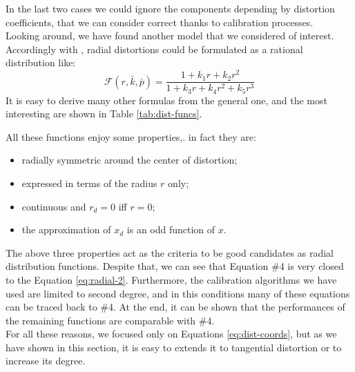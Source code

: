 In the last two cases we could ignore the components depending by distortion coefficients, that we can consider correct thanks to calibration processes. \\

Looking around, we have found another model that we considered of interest. Accordingly with \cite{DBLP:journals/corr/cs-CV-0308003}, radial distortions could be formulated as a rational distribution like:
  \begin{equation*}
    \mathcal{F}\left( r, \bar{k}, \bar{p} \right) = \frac{1 + k_1r + k_2r^2}{1 + k_3r + k_4r^2 + k_5r^3}
  \end{equation*}
It is easy to derive many other formulas from the general one, and the most interesting are shown in Table \ref{tab:dist-funcs}.
  
All these functions enjoy some properties,. in fact they are:
  \begin{itemize}
    \item radially symmetric around the center of distortion;
    \item expressed in terms of the radius $r$ only;
    \item continuous and $r_d = 0$ iff $r = 0$;
    \item the approximation of $x_d$ is an odd function of $x$.
  \end{itemize}
The above three properties act as the criteria to be good candidates as radial distribution functions. Despite that, we can see that Equation \#4 is very closed to the Equation \ref{eq:radial-2}. Furthermore, the calibration algorithms we have used are limited to second degree, and in this conditions many of these equations can be traced back to \#4. At the end, it can be shown that the performances of the remaining functions are comparable with \#4. \\
For all these reasons, we focused only on Equations \ref{eq:dist-coords}, but as we have shown in this section, it is easy to extends it to tangential distortion or to increase its degree.

